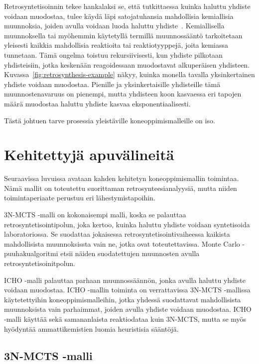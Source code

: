 \documentclass[finnish,twoside,censored,tkt,sw-line]{HYthesisML}
\begin{document}
Retrosyntetisoinnin tekee hankalaksi se, että tutkittaessa kuinka haluttu yhdiste voidaan muodostaa, tulee käydä läpi satojatuhansia mahdollisia kemiallisia muunnoksia, joiden avulla voidaan luoda haluttu yhdiste~\cite{SeglerMarwinHS2018Pcsw}.
Kemiallisella muunnoksella tai myöhemmin käytetyllä termillä muunnossääntö tarkoitetaan yleisesti kaikkia mahdollisia reaktioita tai reaktiotyyppejä, joita kemiassa tunnetaan.
Tämä ongelma toistuu rekursiivisesti, kun yhdiste pilkotaan yhdisteisiin, jotka keskenään reagoidessaan muodostavat alkuperäisen yhdisteen.
Kuvassa~\ref{fig:retrosynthesis-example} näkyy, kuinka monella tavalla yksinkertainen yhdiste voidaan muodostaa.
Pienille ja yksinkertaisille yhdisteille tämä muunnostenavaruus on pienempi, mutta yhdisteen koon kasvaessa eri tapojen määrä muodostaa haluttu yhdiste kasvaa eksponentiaalisesti.

Tästä johtuen tarve prosessia yleistäville koneoppimismalleille on iso.

\section{Kehitettyjä apuvälineitä}

Seuraavissa luvuissa avataan kahden kehitetyn koneoppimismallin toimintaa.
Nämä mallit on toteutettu suorittaman retrosynteesianalyysiä, mutta niiden toimintaperiaate perustuu eri lähestymistapoihin.

3N-MCTS -malli on kokonaisempi malli, koska se palauttaa retrosyntetisointipolun, joka kertoo, kuinka haluttu yhdiste voidaan syntetisoida laboratoriossa.
Se suodattaa jokaisessa retrosyntetisointivaiheessa kaikista mahdollisista muunnoksissta vain ne, jotka ovat toteutettavissa.
Monte Carlo -puuhakualgoritmi etsii näiden suodatettujen muunnosten avulla retrosyntetisoinitpolun.

ICHO -malli palauttaa parhaan muunnossäännön, jonka avulla haluttu yhdiste voidaan muodostaa.
ICHO -mallin toiminta on verrattavissa 3N-MCTS -mallissa käytetettyihin koneoppimismalleihin, jotka yhdessä suodattavat mahdollisista muunnoksista vain parhaimmat, joiden avulla yhdiste voidaan muodostaa.
ICHO -malli käyttää sekä samananlaista reaktiodataa kuin 3N-MCTS, mutta se myös hyödyntää ammattikemistien luomia heuristisia sääntöjä.

\subsection{3N-MCTS -malli}
\end{document}
